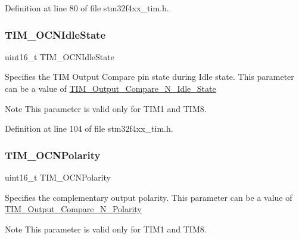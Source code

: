 Definition at line 80 of file stm32f4xx\+\_\+tim.\+h.

\mbox{\label{struct_t_i_m___o_c_init_type_def_a68f0241aa8d57bb42cd8e56c153f8e48}} 
\subsubsection{\texorpdfstring{T\+I\+M\+\_\+\+O\+C\+N\+Idle\+State}{TIM\_OCNIdleState}}
{\footnotesize\ttfamily uint16\+\_\+t T\+I\+M\+\_\+\+O\+C\+N\+Idle\+State}

Specifies the T\+IM Output Compare pin state during Idle state. This parameter can be a value of \hyperlink{group___t_i_m___output___compare___n___idle___state}{T\+I\+M\+\_\+\+Output\+\_\+\+Compare\+\_\+\+N\+\_\+\+Idle\+\_\+\+State} \begin{DoxyNote}{Note}
This parameter is valid only for T\+I\+M1 and T\+I\+M8. 
\end{DoxyNote}


Definition at line 104 of file stm32f4xx\+\_\+tim.\+h.

\mbox{\label{struct_t_i_m___o_c_init_type_def_aa392739b843a7974702c5ec71864f982}} 
\subsubsection{\texorpdfstring{T\+I\+M\+\_\+\+O\+C\+N\+Polarity}{TIM\_OCNPolarity}}
{\footnotesize\ttfamily uint16\+\_\+t T\+I\+M\+\_\+\+O\+C\+N\+Polarity}

Specifies the complementary output polarity. This parameter can be a value of \hyperlink{group___t_i_m___output___compare___n___polarity}{T\+I\+M\+\_\+\+Output\+\_\+\+Compare\+\_\+\+N\+\_\+\+Polarity} \begin{DoxyNote}{Note}
This parameter is valid only for T\+I\+M1 and T\+I\+M8. 
\end{DoxyNote}


